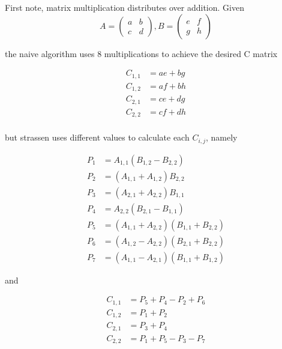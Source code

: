 \documentclass{article}
\begin{document}
First note, matrix multiplication distributes over addition. Given 
\begin{equation}
    A = \begin{pmatrix} a & b \\ c & d \end{pmatrix}, 
    B = \begin{pmatrix} e & f \\ g & h \end{pmatrix}
\end{equation}

the naive algorithm uses 8 multiplications to achieve the desired C matrix 


\begin{equation}
    \begin{split}
        C_{1,1} &= ae + bg\\
        C_{1,2} &= af + bh\\
        C_{2,1} &= ce + dg\\
        C_{2,2} &= cf + dh\\
    \end{split}
\end{equation}


but strassen uses different values to calculate each \(C_{i,j}\), namely

\begin{equation}
    \begin{split}
        P_1 &= A_{1,1}(B_{1,2} - B_{2,2})\\
        P_2 &= (A_{1,1} + A_{1,2})B_{2,2}\\
        P_3 &= (A_{2,1} + A_{2,2})B_{1,1}\\
        P_4 &= A_{2,2}(B_{2,1} - B_{1,1})\\
        P_5& = (A_{1,1} + A_{2,2})(B_{1,1} + B_{2,2})\\
        P_6& = (A_{1,2} - A_{2,2})(B_{2,1} + B_{2,2})\\
        P_7 &= (A_{1,1} - A_{2,1})(B_{1,1} + B_{1,2})
    \end{split}
\end{equation}

and 

\begin{equation}
    \begin{split}
        C_{1,1} &= P_5 + P_4 - P_2 + P_6\\
        C_{1,2} &= P_1 + P_2\\
        C_{2,1} &= P_3 + P_4\\
        C_{2,2} &= P_1 + P_5 - P_3 - P_7
    \end{split}
\end{equation}
\end{document}
